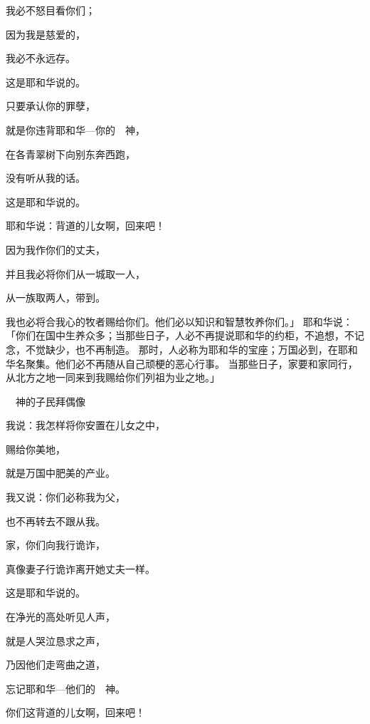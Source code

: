 {\par }{\Q 我必不怒目看你们；
\par }{\Q 因为我是慈爱的，
\par }{\Q 我必不永远存{}。
\par }{\Q 这是耶和华说的。
\par }{\Q {}只要承认你的罪孽，
\par }{\Q 就是你违背耶和华—你的　神，
\par }{\Q 在各青翠树下向别{}东奔西跑，
\par }{\Q 没有听从我的话。
\par }{\Q 这是耶和华说的。
\par }{\BB \par }{\Q {}耶和华说：背道的儿女啊，回来吧！
\par }{\Q 因为我作你们的丈夫，
\par }{\Q 并且我必将你们从一城取一人，
\par }{\Q 从一族取两人，带到{}。
\par }{\PP {}我也必将合我心的牧者赐给你们。他们必以知识和智慧牧养你们。」
耶和华说：「你们在国中生养众多；当那些日子，人必不再提说耶和华的约柜，不追想，不记念，不觉缺少，也不再制造。
那时，人必称{}为耶和华的宝座；万国必到{}，在耶和华{}名{}聚集。他们必不再随从自己顽梗的恶心行事。
当那些日子，{}家要和{}家同行，从北方之地一同来到我赐给你们列祖为业之地。」
\par }{\SH 　神的子民拜偶像
\par }{\Q {}我说：我怎样将你安置在儿女之中，
\par }{\Q 赐给你美地，
\par }{\Q 就是万国中肥美的产业。
\par }{\Q 我又说：你们必称我为父，
\par }{\Q 也不再转去不跟从我。
\par }{\Q {}家，你们向我行诡诈，
\par }{\Q 真像妻子行诡诈离开她丈夫一样。
\par }{\Q 这是耶和华说的。
\par }{\BB \par }{\Q {}在净光的高处听见人声，
\par }{\Q 就是{}人哭泣恳求之声，
\par }{\Q 乃因他们走弯曲之道，
\par }{\Q 忘记耶和华—他们的　神。
\par }{\Q {}你们这背道的儿女啊，回来吧！
}
